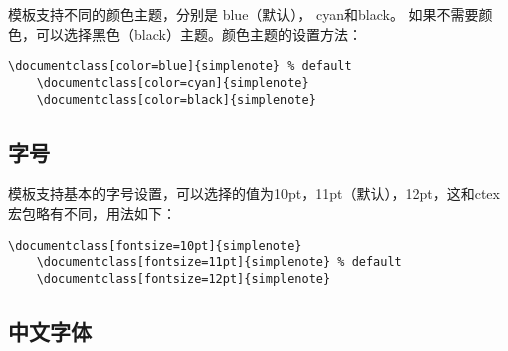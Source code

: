 \documentclass[cnfont=NotoCJK]{../simplenote}
\begin{document}
模板支持不同的颜色主题，分别是 \textcolor{eblue}{blue}（默认），
\textcolor{ecyan}{cyan}和\textcolor{eblack}{black}。
如果不需要颜色，可以选择黑色（black）主题。颜色主题的设置方法：

\begin{lstlisting}[frame=single]
    \documentclass[color=blue]{simplenote} % default
    \documentclass[color=cyan]{simplenote}
    \documentclass[color=black]{simplenote}
\end{lstlisting}

\subsection{字号}

模板支持基本的字号设置，可以选择的值为10pt，11pt（默认），12pt，这和ctex宏包略有不同，用法如下：
\begin{lstlisting}[frame=single]
    \documentclass[fontsize=10pt]{simplenote}
    \documentclass[fontsize=11pt]{simplenote} % default
    \documentclass[fontsize=12pt]{simplenote}
\end{lstlisting}


\subsection{中文字体}
\end{document}
